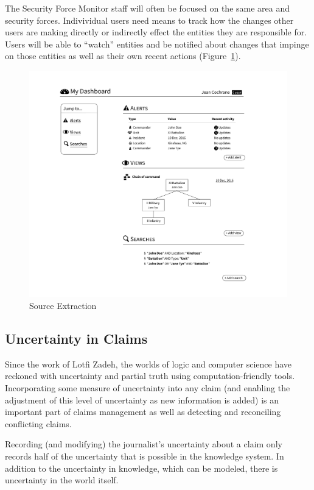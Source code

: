 \documentclass[format=siggraph, review=true]{acmart}
\begin{document}
The Security Force Monitor staff will often be focused on the same
area and security forces. Indivividual users need means to track how
the changes other users are making directly or indirectly effect the
entities they are responsible for. Users will be able to ``watch''
entities and be notified about changes that impinge on those entities
as well as their own recent actions (Figure~\ref{fig:dashboard}).

\begin{figure}[h]
\includegraphics[width=\columnwidth]{images/sketches/dashboard.png}
\caption{Source Extraction}
\label{fig:dashboard}
\end{figure}



\subsection{Uncertainty in Claims}
Since the work of Lotfi Zadeh, the worlds of logic
and computer science have reckoned with uncertainty and partial truth
using computation-friendly tools.\cite{zadeh} Incorporating some measure of
uncertainty into any claim (and enabling the adjustment of this level
of uncertainty as new information is added) is an important part of
claims management as well as detecting and reconciling conflicting
claims.


Recording (and modifying) the journalist's uncertainty about a claim
only records half of the uncertainty that is possible in the
knowledge system. In addition to the uncertainty in knowledge,
which can be modeled, there is uncertainty in the world itself.
\end{document}
